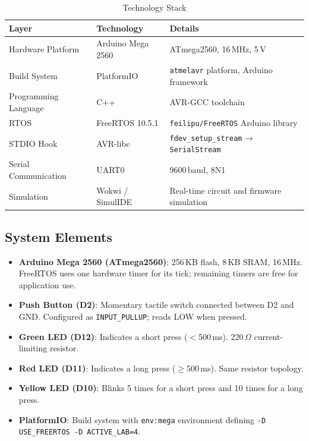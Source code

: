 \documentclass[12pt]{article}
\begin{document}
\begin{table}[H]
\centering
\begin{tabular}{@{}lll@{}}
\toprule
\textbf{Layer} & \textbf{Technology} & \textbf{Details} \\
\midrule
Hardware Platform    & Arduino Mega 2560  & ATmega2560, 16\,MHz, 5\,V \\
Build System         & PlatformIO         & \texttt{atmelavr} platform, Arduino framework \\
Programming Language & C++                & AVR-GCC toolchain \\
RTOS                 & FreeRTOS 10.5.1    & \texttt{feilipu/FreeRTOS} Arduino library \\
STDIO Hook           & AVR-libc           & \texttt{fdev\_setup\_stream} → \texttt{SerialStream} \\
Serial Communication & UART0              & 9600\,baud, 8N1 \\
Simulation           & Wokwi / SimulIDE   & Real-time circuit and firmware simulation \\
\bottomrule
\end{tabular}
\caption{Technology Stack}
\label{tab:techstack}
\end{table}

\subsection{System Elements}

\begin{itemize}
  \item \textbf{Arduino Mega 2560 (ATmega2560)}: 256\,KB flash, 8\,KB SRAM, 16\,MHz. FreeRTOS uses one hardware timer for its tick; remaining timers are free for application use.
  \item \textbf{Push Button (D2)}: Momentary tactile switch connected between D2 and GND. Configured as \texttt{INPUT\_PULLUP}; reads LOW when pressed.
  \item \textbf{Green LED (D12)}: Indicates a short press (\(<\)500\,ms). 220\,\(\Omega\) current-limiting resistor.
  \item \textbf{Red LED (D11)}: Indicates a long press (\(\geq\)500\,ms). Same resistor topology.
  \item \textbf{Yellow LED (D10)}: Blinks 5 times for a short press and 10 times for a long press.
  \item \textbf{PlatformIO}: Build system with \texttt{env:mega} environment defining \texttt{-D USE\_FREERTOS -D ACTIVE\_LAB=4}. \cite{pio}
\end{itemize}
\end{document}
